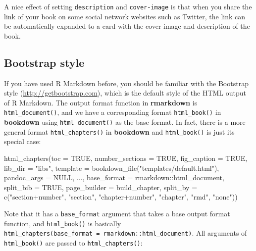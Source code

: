 \documentclass[
  12pt,
]{krantz}
\newenvironment{Shaded}{\begin{snugshade}}{\end{snugshade}}
\newcommand{\AttributeTok}[1]{\textcolor[rgb]{0.77,0.63,0.00}{#1}}
\newcommand{\ConstantTok}[1]{\textcolor[rgb]{0.00,0.00,0.00}{#1}}
\newcommand{\FunctionTok}[1]{\textcolor[rgb]{0.00,0.00,0.00}{#1}}
\newcommand{\NormalTok}[1]{#1}
\newcommand{\SpecialCharTok}[1]{\textcolor[rgb]{0.00,0.00,0.00}{#1}}
\newcommand{\StringTok}[1]{\textcolor[rgb]{0.31,0.60,0.02}{#1}}
\theoremstyle{definition}
\theoremstyle{definition}
\theoremstyle{definition}
\theoremstyle{definition}
\theoremstyle{remark}
\begin{document}
A nice effect of setting \texttt{description} and \texttt{cover-image} is that when you share the link of your book on some social network websites such as Twitter, the link can be automatically expanded to a card with the cover image and description of the book.

\hypertarget{bootstrap-style}{%
\subsection{Bootstrap style}\label{bootstrap-style}}

If you have used R Markdown before, you should be familiar with the Bootstrap style (\url{http://getbootstrap.com}), which is the default style of the HTML output of R Markdown. The output format function in \textbf{rmarkdown} is \texttt{html\_document()}, and we have a corresponding format \texttt{html\_book()} in \textbf{bookdown} using \texttt{html\_document()} as the base format. In fact, there is a more general format \texttt{html\_chapters()} in \textbf{bookdown} and \texttt{html\_book()} is just its special case:

\begin{Shaded}
\begin{Highlighting}[]
\FunctionTok{html\_chapters}\NormalTok{(}\AttributeTok{toc =} \ConstantTok{TRUE}\NormalTok{, }\AttributeTok{number\_sections =} \ConstantTok{TRUE}\NormalTok{,}
  \AttributeTok{fig\_caption =} \ConstantTok{TRUE}\NormalTok{, }\AttributeTok{lib\_dir =} \StringTok{"libs"}\NormalTok{,}
  \AttributeTok{template =} \FunctionTok{bookdown\_file}\NormalTok{(}\StringTok{"templates/default.html"}\NormalTok{),}
  \AttributeTok{pandoc\_args =} \ConstantTok{NULL}\NormalTok{, ...,}
  \AttributeTok{base\_format =}\NormalTok{ rmarkdown}\SpecialCharTok{::}\NormalTok{html\_document,}
  \AttributeTok{split\_bib =} \ConstantTok{TRUE}\NormalTok{, }\AttributeTok{page\_builder =}\NormalTok{ build\_chapter,}
  \AttributeTok{split\_by =} \FunctionTok{c}\NormalTok{(}\StringTok{"section+number"}\NormalTok{, }\StringTok{"section"}\NormalTok{, }\StringTok{"chapter+number"}\NormalTok{, }\StringTok{"chapter"}\NormalTok{, }\StringTok{"rmd"}\NormalTok{, }\StringTok{"none"}\NormalTok{))}
\end{Highlighting}
\end{Shaded}

Note that it has a \texttt{base\_format} argument that takes a base output format function, and \texttt{html\_book()} is basically \texttt{html\_chapters(base\_format\ =\ rmarkdown::html\_document)}. All arguments of \texttt{html\_book()} are passed to \texttt{html\_chapters()}:
\end{document}
